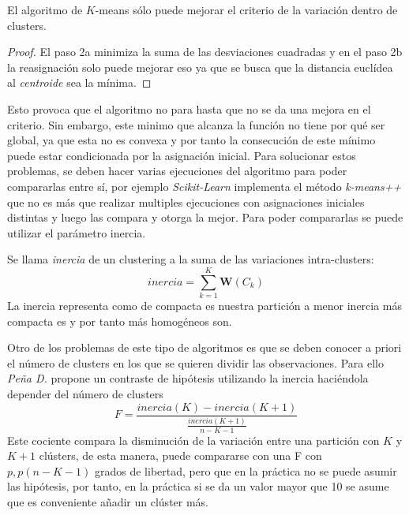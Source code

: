 \begin{propo}
El algoritmo de $K$-means sólo puede mejorar el criterio de la variación dentro de clusters. 
\begin{proof}
El paso 2a minimiza la suma de las desviaciones cuadradas y en el paso 2b la reasignación solo puede mejorar eso ya que se busca que la distancia euclídea al \emph{centroide} sea la mínima. 
\end{proof}
\end{propo}

\noindent Esto provoca que el algoritmo no para hasta que no se da una mejora en el criterio. Sin embargo, este minimo que alcanza la función no tiene por qué ser global, ya que esta no es convexa y por tanto la consecución de este mínimo puede estar condicionada por la asignación inicial. Para solucionar estos problemas, se deben hacer varias ejecuciones del algoritmo para poder compararlas entre sí, por ejemplo \emph{Scikit-Learn} implementa el método \emph{k-means++} que no es más que realizar multiples ejecuciones con asignaciones iniciales distintas y luego las compara y otorga la mejor. 
Para poder compararlas se puede utilizar el parámetro inercia. 

\begin{defi}
Se llama \emph{inercia} de un clustering a la suma de las variaciones intra-clusters:
\begin{equation}
inercia=\sum_{k=1}^K \textbf{W}(C_k)
\end{equation}
La inercia representa como de compacta es nuestra partición a menor inercia más compacta es y por tanto más homogéneos son. 
\end{defi}

\noindent Otro de los problemas de este tipo de algoritmos es que se deben conocer a priori el número de clusters en los que se quieren dividir las observaciones. Para ello \emph{Peña D.}\cite{Peña 2002} propone un contraste de hipótesis  utilizando la inercia haciéndola depender del número de clusters
\begin{equation}
F=\dfrac{inercia(K)-inercia(K+1)}{\frac{inercia(K+1)}{n-K-1}}
\end{equation}
Este cociente compara la disminución de la variación entre una partición con $K$ y $K+1$ clústers, de esta manera, puede compararse con una F con $p,p(n-K-1)$ grados de libertad, pero que en la práctica no se puede asumir las hipótesis, por tanto, en la práctica si se da un valor mayor que 10 se asume que es conveniente añadir un clúster más. 

